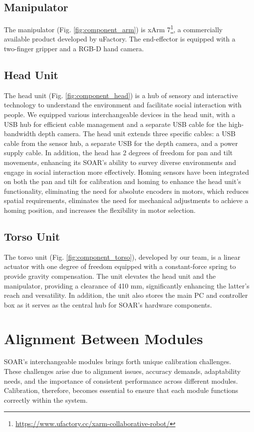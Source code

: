 \documentclass[runningheads,a4paper]{llncs}
\begin{document}
\subsection{Manipulator}
The manipulator (Fig. \ref{fig:component_arm}) is xArm 7\footnote{\url{https://www.ufactory.cc/xarm-collaborative-robot/}}, a commercially available product developed by uFactory.
The end-effector is equipped with a two-finger gripper and a RGB-D hand camera.

\subsection{Head Unit}
The head unit (Fig. \ref{fig:component_head}) is a hub of sensory and interactive technology to understand the environment and facilitate social interaction with people.
We equipped various interchangeable devices in the head unit, with a USB hub for efficient cable management and a separate USB cable for the high-bandwidth depth camera.
The head unit extends three specific cables: a USB cable from the sensor hub, a separate USB for the depth camera, and a power supply cable.
In addition, the head has 2 degrees of freedom for pan and tilt movements, enhancing its SOAR’s ability to survey diverse environments and engage in social interaction more effectively.
Homing sensors have been integrated on both the pan and tilt for calibration and homing to enhance the head unit's functionality, eliminating the need for absolute encoders in motors, which reduces spatial requirements, eliminates the need for mechanical adjustments to achieve a homing position, and increases the flexibility in motor selection.

\subsection{Torso Unit}
The torso unit (Fig. \ref{fig:component_torso}), developed by our team, is a linear actuator with one degree of freedom equipped with a constant-force spring to provide gravity compensation.
The unit elevates the head unit and the manipulator, providing a clearance of 410 mm, significantly enhancing the latter's reach and versatility.
In addition, the unit also stores the main PC and controller box as it serves as the central hub for SOAR's hardware components.

\section{Alignment Between Modules}
SOAR’s interchangeable modules brings forth unique calibration challenges.
These challenges arise due to alignment issues, accuracy demands, adaptability needs, and the importance of consistent performance across different modules.
Calibration, therefore, becomes essential to ensure that each module functions correctly within the system.
\end{document}

